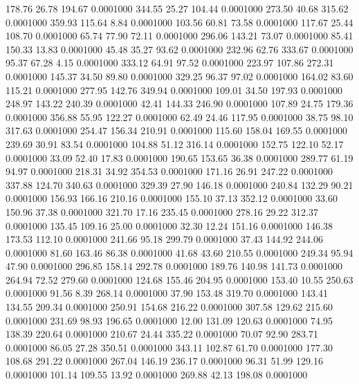  178.76   26.78  194.67   0.0001000
 344.55   25.27  104.44   0.0001000
 273.50   40.68  315.62   0.0001000
 359.93  115.64    8.84   0.0001000
 103.56   60.81   73.58   0.0001000
 117.67   25.44  108.70   0.0001000
  65.74   77.90   72.11   0.0001000
 296.06  143.21   73.07   0.0001000
  85.41  150.33   13.83   0.0001000
  45.48   35.27   93.62   0.0001000
 232.96   62.76  333.67   0.0001000
  95.37   67.28    4.15   0.0001000
 333.12   64.91   97.52   0.0001000
 223.97  107.86  272.31   0.0001000
 145.37   34.50   89.80   0.0001000
 329.25   96.37   97.02   0.0001000
 164.02   83.60  115.21   0.0001000
 277.95  142.76  349.94   0.0001000
 109.01   34.50  197.93   0.0001000
 248.97  143.22  240.39   0.0001000
  42.41  144.33  246.90   0.0001000
 107.89   24.75  179.36   0.0001000
 356.88   55.95  122.27   0.0001000
  62.49   24.46  117.95   0.0001000
  38.75   98.10  317.63   0.0001000
 254.47  156.34  210.91   0.0001000
 115.60  158.04  169.55   0.0001000
 239.69   30.91   83.54   0.0001000
 104.88   51.12  316.14   0.0001000
 152.75  122.10   52.17   0.0001000
  33.09   52.40   17.83   0.0001000
 190.65  153.65   36.38   0.0001000
 289.77   61.19   94.97   0.0001000
 218.31   34.92  354.53   0.0001000
 171.16   26.91  247.22   0.0001000
 337.88  124.70  340.63   0.0001000
 329.39   27.90  146.18   0.0001000
 240.84  132.29   90.21   0.0001000
 156.93  166.16  210.16   0.0001000
 155.10   37.13  352.12   0.0001000
  33.60  150.96   37.38   0.0001000
 321.70   17.16  235.45   0.0001000
 278.16   29.22  312.37   0.0001000
 135.45  109.16   25.00   0.0001000
  32.30   12.24  151.16   0.0001000
 146.38  173.53  112.10   0.0001000
 241.66   95.18  299.79   0.0001000
  37.43  144.92  244.06   0.0001000
  81.60  163.46   86.38   0.0001000
  41.68   43.60  210.55   0.0001000
 249.34   95.94   47.90   0.0001000
 296.85  158.14  292.78   0.0001000
 189.76  140.98  141.73   0.0001000
 264.94   72.52  279.60   0.0001000
 124.68  155.46  204.95   0.0001000
 153.40   10.55  250.63   0.0001000
  91.56    8.39  268.14   0.0001000
  37.90  153.48  319.70   0.0001000
 143.41  134.55  209.34   0.0001000
 250.91  154.68  216.22   0.0001000
 307.58  129.62  215.60   0.0001000
 231.69   98.93  196.65   0.0001000
  12.00  131.09  120.63   0.0001000
  74.95  138.39  220.64   0.0001000
 210.67   24.44  335.22   0.0001000
  70.07   92.90  283.71   0.0001000
  86.05   27.28  350.51   0.0001000
 343.11  102.87   61.70   0.0001000
 177.30  108.68  291.22   0.0001000
 267.04  146.19  236.17   0.0001000
  96.31   51.99  129.16   0.0001000
 101.14  109.55   13.92   0.0001000
 269.88   42.13  198.08   0.0001000
